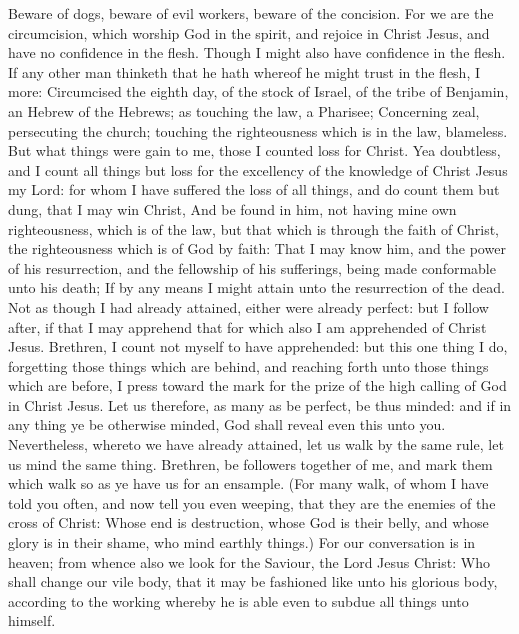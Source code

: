  Beware of dogs, beware of evil workers, beware of the
concision.  For we are the circumcision, which worship God
in the spirit, and rejoice in Christ Jesus, and have no confidence in
the flesh.  Though I might also have confidence in the
flesh. If any other man thinketh that he hath whereof he might trust in
the flesh, I more:  Circumcised the eighth day, of the stock
of Israel, of the tribe of Benjamin, an Hebrew of the Hebrews; as
touching the law, a Pharisee;  Concerning zeal, persecuting
the church; touching the righteousness which is in the law, blameless.
 But what things were gain to me, those I counted loss for
Christ.  Yea doubtless, and I count all things but loss for
the excellency of the knowledge of Christ Jesus my Lord: for whom I have
suffered the loss of all things, and do count them but dung, that I may
win Christ,  And be found in him, not having mine own
righteousness, which is of the law, but that which is through the faith
of Christ, the righteousness which is of God by faith: 
That I may know him, and the power of his resurrection, and the
fellowship of his sufferings, being made conformable unto his death;
 If by any means I might attain unto the resurrection of
the dead.  Not as though I had already attained, either
were already perfect: but I follow after, if that I may apprehend that
for which also I am apprehended of Christ Jesus.  Brethren,
I count not myself to have apprehended: but this one thing I do,
forgetting those things which are behind, and reaching forth unto those
things which are before,  I press toward the mark for the
prize of the high calling of God in Christ Jesus.  Let us
therefore, as many as be perfect, be thus minded: and if in any thing ye
be otherwise minded, God shall reveal even this unto you. 
Nevertheless, whereto we have already attained, let us walk by the same
rule, let us mind the same thing.  Brethren, be followers
together of me, and mark them which walk so as ye have us for an
ensample.  (For many walk, of whom I have told you often,
and now tell you even weeping, that they are the enemies of the cross of
Christ:  Whose end is destruction, whose God is their
belly, and whose glory is in their shame, who mind earthly things.)
 For our conversation is in heaven; from whence also we
look for the Saviour, the Lord Jesus Christ:  Who shall
change our vile body, that it may be fashioned like unto his glorious
body, according to the working whereby he is able even to subdue all
things unto himself.


